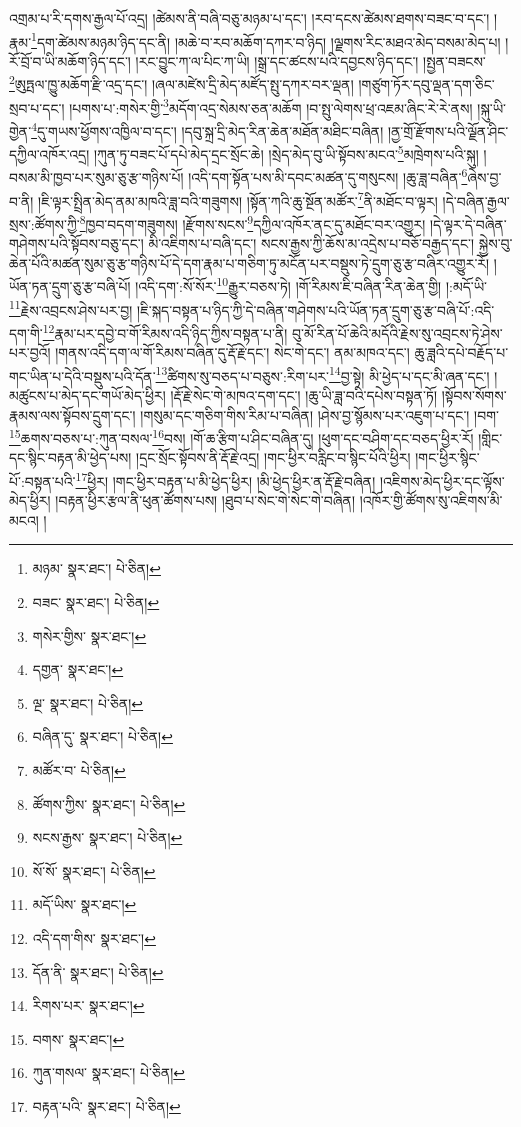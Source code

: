 འགྲམ་པ་རི་དགས་རྒྱལ་པོ་འདྲ། །ཚེམས་ནི་བཞི་བཅུ་མཉམ་པ་དང་། །རབ་དངས་ཚེམས་ཐགས་བཟང་བ་དང་། །རྣམ་\footnote{མཉམ་  སྣར་ཐང་།  པེ་ཅིན། }དག་ཚེམས་མཉམ་ཉིད་དང་ནི། །མཆེ་བ་རབ་མཆོག་དཀར་བ་ཉིད། །ལྗགས་རིང་མཐའ་མེད་བསམ་མེད་པ། །རོ་བྲོ་བ་ཡི་མཆོག་ཉིད་དང་། །རང་བྱུང་ཀ་ལ་པིང་ཀ་ཡི། །སྒྲ་དང་ཚངས་པའི་དབྱངས་ཉིད་དང་། །སྤྱན་བཟངས་\footnote{བཟང་  སྣར་ཐང་།  པེ་ཅིན། }ཨུཏྤལ་ཁྱུ་མཆོག་རྫི་འདྲ་དང་། །ཞལ་མཛེས་དྲི་མེད་མཛོད་སྤུ་དཀར་བར་ལྡན། །གཙུག་ཏོར་དབུ་ལྡན་དག་ཅིང་སྲབ་པ་དང་། །པགས་པ་:གསེར་གྱི་\footnote{གསེར་གྱིས་  སྣར་ཐང་། }མདོག་འདྲ་སེམས་ཅན་མཆོག །བ་སྤུ་ལེགས་ཕྲ་འཇམ་ཞིང་རེ་རེ་ནས། །སྐུ་ཡི་གྱེན་\footnote{དགྱན་  སྣར་ཐང་། }དུ་གཡས་ཕྱོགས་འཁྱིལ་བ་དང་། །དབུ་སྐྲ་དྲི་མེད་རིན་ཆེན་མཐོན་མཐིང་བཞིན། །ནྱ་གྲོ་རྫོགས་པའི་ལྗོན་ཤིང་དཀྱིལ་འཁོར་འདྲ། །ཀུན་ཏུ་བཟང་པོ་དཔེ་མེད་དྲང་སྲོང་ཆེ། །སྲེད་མེད་བུ་ཡི་སྟོབས་མངའ་\footnote{ལྔ་  སྣར་ཐང་།  པེ་ཅིན། }མཁྲེགས་པའི་སྐུ། །བསམ་མི་ཁྱབ་པར་སུམ་ཅུ་རྩ་གཉིས་པོ། །འདི་དག་སྟོན་པས་མི་དབང་མཚན་དུ་གསུངས། །ཆུ་ཟླ་བཞིན་\footnote{བཞིན་དུ་  སྣར་ཐང་།  པེ་ཅིན། }ཞེས་བྱ་བ་ནི། །ཇི་ལྟར་སྤྲིན་མེད་ནམ་མཁའི་ཟླ་བའི་གཟུགས། །སྟོན་ཀའི་ཆུ་སྔོན་མཚོར་\footnote{མཚོར་བ་  པེ་ཅིན། }ནི་མཐོང་བ་ལྟར། །དེ་བཞིན་རྒྱལ་སྲས་:ཚོགས་ཀྱི་\footnote{ཚོགས་ཀྱིས་  སྣར་ཐང་།  པེ་ཅིན། }ཁྱབ་བདག་གཟུགས། །རྫོགས་སངས་\footnote{སངས་རྒྱས་  སྣར་ཐང་།  པེ་ཅིན། }དཀྱིལ་འཁོར་ནང་དུ་མཐོང་བར་འགྱུར། །དེ་ལྟར་དེ་བཞིན་གཤེགས་པའི་སྟོབས་བཅུ་དང་། མི་འཇིགས་པ་བཞི་དང་། སངས་རྒྱས་ཀྱི་ཆོས་མ་འདྲེས་པ་བཅོ་བརྒྱད་དང་། སྐྱེས་བུ་ཆེན་པོའི་མཚན་སུམ་ཅུ་རྩ་གཉིས་པོ་དེ་དག་རྣམ་པ་གཅིག་ཏུ་མངོན་པར་བསྡུས་ཏེ་དྲུག་ཅུ་རྩ་བཞིར་འགྱུར་རོ། །ཡོན་ཏན་དྲུག་ཅུ་རྩ་བཞི་པོ། །འདི་དག་:སོ་སོར་\footnote{སོ་སོ་  སྣར་ཐང་།  པེ་ཅིན། }རྒྱུར་བཅས་ཏེ། །གོ་རིམས་ཇི་བཞིན་རིན་ཆེན་གྱི། །:མདོ་ཡི་\footnote{མདོ་ཡིས་  སྣར་ཐང་། }རྗེས་འབྲངས་ཤེས་པར་བྱ། །ཇི་སྐད་བསྟན་པ་ཉིད་ཀྱི་དེ་བཞིན་གཤེགས་པའི་ཡོན་ཏན་དྲུག་ཅུ་རྩ་བཞི་པོ་:འདི་དག་གི་\footnote{འདི་དག་གིས་  སྣར་ཐང་། }རྣམ་པར་དབྱེ་བ་གོ་རིམས་འདི་ཉིད་ཀྱིས་བསྟན་པ་ནི། བུ་མོ་རིན་པོ་ཆེའི་མདོའི་རྗེས་སུ་འབྲངས་ཏེ་ཤེས་པར་བྱའོ། །གནས་འདི་དག་ལ་གོ་རིམས་བཞིན་དུ་རྡོ་རྗེ་དང་། སེང་གེ་དང་། ནམ་མཁའ་དང་། ཆུ་ཟླའི་དཔེ་བརྗོད་པ་གང་ཡིན་པ་དེའི་བསྡུས་པའི་དོན་\footnote{དོན་ནི་  སྣར་ཐང་།  པེ་ཅིན། }ཚིགས་སུ་བཅད་པ་བཅུས་:རིག་པར་\footnote{རིགས་པར་  སྣར་ཐང་། }བྱ་སྟེ། མི་ཕྱེད་པ་དང་མི་ཞན་དང་། །མཚུངས་པ་མེད་དང་གཡོ་མེད་ཕྱིར། །རྡོ་རྗེ་སེང་གེ་མཁའ་དག་དང་། །ཆུ་ཡི་ཟླ་བའི་དཔེས་བསྟན་ཏོ། །སྟོབས་སོགས་རྣམས་ལས་སྟོབས་དྲུག་དང་། །གསུམ་དང་གཅིག་གིས་རིམ་པ་བཞིན། །ཤེས་བྱ་སྙོམས་པར་འཇུག་པ་དང་། །བག་\footnote{བགས་  སྣར་ཐང་། }ཆགས་བཅས་པ་:ཀུན་བསལ་\footnote{ཀུན་གསལ་  སྣར་ཐང་།  པེ་ཅིན། }བས། །གོ་ཆ་རྩིག་པ་ཤིང་བཞིན་དུ། །ཕུག་དང་བཤིག་དང་བཅད་ཕྱིར་རོ། །གླིང་དང་སྙིང་བརྟན་མི་ཕྱེད་པས། །དྲང་སྲོང་སྟོབས་ནི་རྡོ་རྗེ་འདྲ། །གང་ཕྱིར་བརླིང་བ་སྙིང་པོའི་ཕྱིར། །གང་ཕྱིར་སྙིང་པོ་:བསྟན་པའི་\footnote{བརྟན་པའི་  སྣར་ཐང་།  པེ་ཅིན། }ཕྱིར། །གང་ཕྱིར་བརྟན་པ་མི་ཕྱེད་ཕྱིར། །མི་ཕྱེད་ཕྱིར་ན་རྡོ་རྗེ་བཞིན། །འཇིགས་མེད་ཕྱིར་དང་ལྟོས་མེད་ཕྱིར། །བརྟན་ཕྱིར་རྩལ་ནི་ཕུན་ཚོགས་པས། །ཐུབ་པ་སེང་གེ་སེང་གེ་བཞིན། །འཁོར་གྱི་ཚོགས་སུ་འཇིགས་མི་མངའ། །
